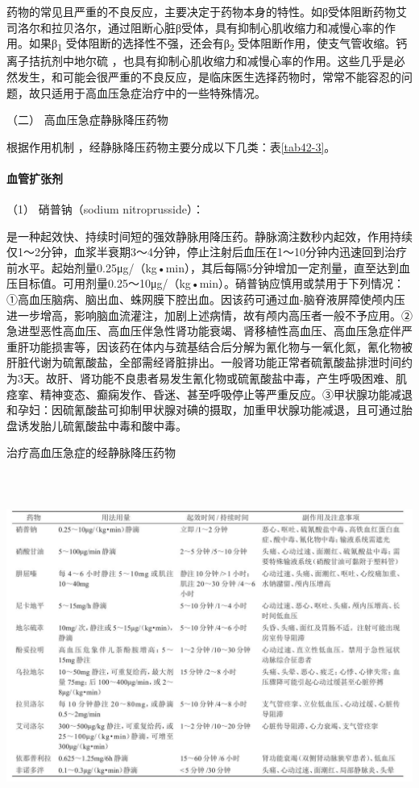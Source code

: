 药物的常见且严重的不良反应，主要决定于药物本身的特性。如β受体阻断药物艾司洛尔和拉贝洛尔，通过阻断心脏β受体，具有抑制心肌收缩力和减慢心率的作用。如果β\textsubscript{1}
受体阻断的选择性不强，还会有β\textsubscript{2}
受体阻断作用，使支气管收缩。钙离子拮抗剂中地尔硫{}
，也具有抑制心肌收缩力和减慢心率的作用。这些几乎是必然发生，和可能会很严重的不良反应，是临床医生选择药物时，常常不能容忍的问题，故只适用于高血压急症治疗中的一些特殊情况。

\hypertarget{text00108.htmlux5cux23CHP4-7-3-2-2}{}
（二） 高血压急症静脉降压药物

根据作用机制 ，经静脉降压药物主要分成以下几类：表\ref{tab42-3}。

\paragraph{血管扩张剂}

\hypertarget{text00108.htmlux5cux23CHP4-7-3-2-2-1-1}{}
（1） 硝普钠（sodium nitroprusside）：

是一种起效快、持续时间短的强效静脉用降压药。静脉滴注数秒内起效，作用持续仅1～2分钟，血浆半衰期3～4分钟，停止注射后血压在1～10分钟内迅速回到治疗前水平。起始剂量0.25μg/（kg•min），其后每隔5分钟增加一定剂量，直至达到血压目标值。可用剂量0.25～10μg/（kg•min）。硝普钠应慎用或禁用于下列情况：①高血压脑病、脑出血、蛛网膜下腔出血。因该药可通过血-脑脊液屏障使颅内压进一步增高，影响脑血流灌注，加剧上述病情，故有颅内高压者一般不予应用。②急进型恶性高血压、高血压伴急性肾功能衰竭、肾移植性高血压、高血压急症伴严重肝功能损害等，因该药在体内与巯基结合后分解为氰化物与一氧化氮，氰化物被肝脏代谢为硫氰酸盐，全部需经肾脏排出。一般肾功能正常者硫氰酸盐排泄时间约为3天。故肝、肾功能不良患者易发生氰化物或硫氰酸盐中毒，产生呼吸困难、肌痉挛、精神变态、癫痫发作、昏迷、甚至呼吸停止等严重反应。③甲状腺功能减退和孕妇：因硫氰酸盐可抑制甲状腺对碘的摄取，加重甲状腺功能减退，且可通过胎盘诱发胎儿硫氰酸盐中毒和酸中毒。

\begin{table}[htbp]
\centering
\caption{治疗高血压急症的经静脉降压药物}
\label{tab42-3}
\includegraphics[width=6.69792in,height=4.47917in]{./images/Image00157.jpg}
\end{table}

